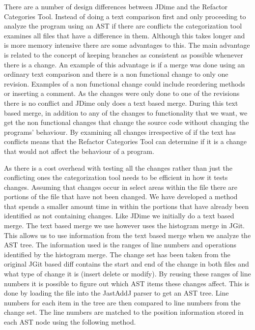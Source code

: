 There are a number of design differences between JDime and the Refactor Categories Tool.  Instead of doing a text comparison first and only proceeding to analyze the program using an AST if there are conflicts the categorization tool examines all files that have a difference in them.  Although this takes longer and is more memory intensive there are some advantages to this. The main advantage is related to the concept of keeping branches as consistent as possible whenever there is a change. An example of this advantage is if a merge was done using an ordinary text comparison and there is a non functional change to only one revision. Examples of a non functional change could include reordering methods or inserting a comment.  As the changes were only done to one of the revisions there is no conflict and JDime only does a text based merge.  During this text based merge, in addition to any of the changes to functionality that we want, we get the non functional changes that change the source code without changing the programs' behaviour. By examining all changes irrespective of if the text has conflicts means that the Refactor Categories Tool can determine if it is a change that would not affect the behaviour of a program.

As there is a cost overhead with testing all the changes rather than just the conflicting ones the categorization tool needs to be efficient in how it tests changes.  Assuming that changes occur in select areas within the file there are portions of the file that have not been changed.  We have developed a method that spends a smaller amount time in  within the portions that have already been identified as not containing changes.  Like JDime we initially do a text based merge.  The text based merge we use however uses the histogram merge in JGit.  This allows us to use information from the text based merge when we analyze the AST tree.  The information used is the ranges of line numbers and operations identified by the histogram merge. The change set has been taken from the original JGit based diff contains the start and end of the change in both files and what type of change it is (insert delete or modify).  By reusing these ranges of line numbers it is possible to figure out which AST items these changes affect. This is done by loading the file into the JastAddJ parser to get an AST tree. Line numbers for each item in the tree are then compared to line numbers from the change set. The line numbers are matched to the position information stored in each AST node using the following method.

